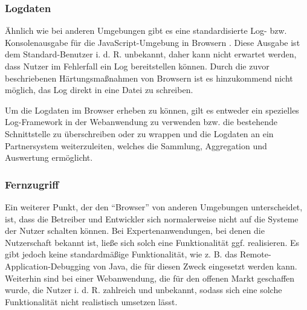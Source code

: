 \subsubsection{Logdaten}
\label{sec:logdaten}

Ähnlich wie bei anderen Umgebungen gibt es eine standardisierte Log- bzw. Konsolenausgabe für die JavaScript-Umgebung in Browsern \cite{MDNConsole}. Diese Ausgabe ist dem Standard-Benutzer i. d. R. unbekannt, daher kann nicht erwartet werden, dass Nutzer im Fehlerfall ein Log bereitstellen können. Durch die zuvor beschriebenen Härtungsmaßnahmen von Browsern ist es hinzukommend nicht möglich, das Log direkt in eine Datei zu schreiben.

Um die Logdaten im Browser erheben zu können, gilt es entweder ein spezielles Log-Framework in der Webanwendung zu verwenden bzw. die bestehende Schnittstelle zu überschreiben oder zu wrappen und die Logdaten an ein Partnersystem weiterzuleiten, welches die Sammlung, Aggregation und Auswertung ermöglicht.

\subsubsection{Fernzugriff}

Ein weiterer Punkt, der den \enquote{Browser} von anderen Umgebungen unterscheidet, ist, dass die Betreiber und Entwickler sich normalerweise nicht auf die Systeme der Nutzer schalten können. Bei Expertenanwendungen, bei denen die Nutzerschaft bekannt ist, ließe sich solch eine Funktionalität ggf. realisieren. Es gibt jedoch keine standardmäßige Funktionalität, wie z. B. das Remote-Application-Debugging \cite{JavaDebugWireProtocol} von Java, die für diesen Zweck eingesetzt werden kann. Weiterhin sind bei einer Webanwendung, die für den offenen Markt geschaffen wurde, die Nutzer i. d. R. zahlreich und unbekannt, sodass sich eine solche Funktionalität nicht realistisch umsetzen lässt.